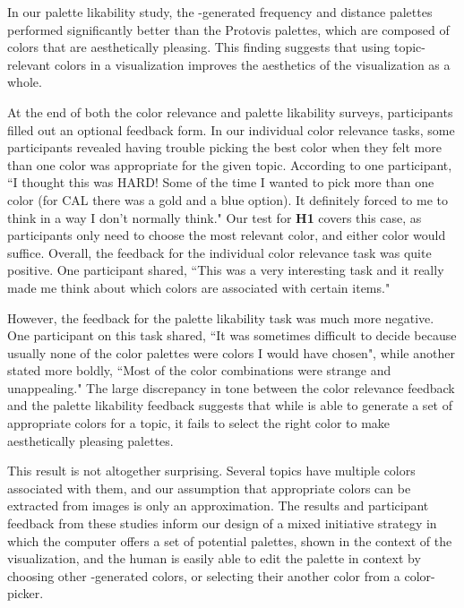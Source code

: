 In our palette likability study, the \system-generated frequency and distance palettes performed significantly better than the Protovis palettes, which are composed of colors that are aesthetically pleasing. This finding suggests that using topic-relevant colors in a visualization improves the aesthetics of the visualization as a whole. 

At the end of both the color relevance and palette likability surveys, participants filled out an optional feedback form. In our individual color relevance tasks, some participants revealed having trouble picking the best color when they felt more than one color was appropriate for the given topic. According to one participant, ``I thought this was HARD! Some of the time I wanted to pick more than one color (for CAL there was a gold and a blue option). It definitely forced to me to think in a way I don't normally think." Our test for \textbf{H1} covers this case, as participants only need to choose the most relevant color, and either color would suffice. Overall, the feedback for the individual color relevance task was quite positive. One participant shared, ``This was a very interesting task and it really made me think about which colors are associated with certain items."

However, the feedback for the palette likability task was much more negative. One participant on this task shared, ``It was sometimes difficult to decide because usually none of the color palettes were colors I would have chosen", while another stated more boldly, ``Most of the color combinations were strange and unappealing." The large discrepancy in tone between the color relevance feedback and the palette likability feedback suggests that while \system is able to generate a set of appropriate colors for a topic, it fails to select the right color to make aesthetically pleasing palettes. 

This result is not altogether surprising. Several topics have multiple colors associated with them, and our assumption that appropriate colors can be extracted from images is only an approximation. The results and participant feedback from these studies inform our design of a mixed initiative strategy in which the computer offers a set of potential palettes, shown in the context of the visualization, and the human is easily able to edit the palette in context by choosing other \system-generated colors, or selecting their another color from a color-picker. 